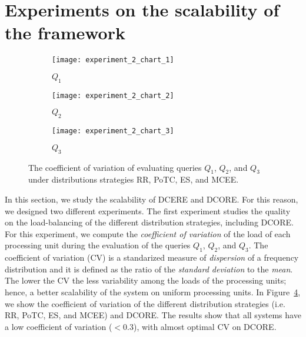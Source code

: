\section{Experiments on the scalability of the framework}\label{sec:scalability}

\begin{figure}[b]
     \begin{adjustbox}{max width=1.5\linewidth,center}
     \centering
     \begin{subfigure}[b]{0.45\textwidth}
         \centering
         \texttt{[image: experiment\_2\_chart\_1]}
         \caption{$Q_{1}$}
         \label{fig:experiment:2:subfigure:1}
     \end{subfigure}
     \begin{subfigure}[b]{0.45\textwidth}
         \centering
         \texttt{[image: experiment\_2\_chart\_2]}
         \caption{$Q_{2}$}
         \label{fig:experiment:2:subfigure:2}
     \end{subfigure}
     \begin{subfigure}[b]{0.45\textwidth}
         \centering
         \texttt{[image: experiment\_2\_chart\_3]}
         \caption{$Q_{3}$}
         \label{fig:experiment:2:subfigure:3}
     \end{subfigure}
     \end{adjustbox}
     \caption{The coefficient of variation of evaluating queries $Q_{1}$, $Q_{2}$, and $Q_{3}$ under distributions strategies RR, PoTC, ES, and MCEE.}
     \label{fig:experiment:2}
\end{figure}

In this section, we study the scalability of DCERE and DCORE. For this reason, we designed two different experiments. The first experiment studies the quality on the load-balancing of the different distribution strategies, including DCORE. For this experiment, we compute the \emph{coefficient of variation} of the load of each processing unit during the evaluation of the queries $Q_{1}$, $Q_{2}$, and $Q_{3}$. The coefficient of variation (CV) is a standarized measure of \emph{dispersion} of a frequency distribution and it is defined as the ratio of the \emph{standard deviation} to the \emph{mean}. The lower the CV the less variability among the loads of the processing units; hence, a better scalability of the system on uniform processing units. In Figure~\ref{fig:experiment:2}, we show the coefficient of variation of the different distribution strategies (i.e. RR, PoTC, ES, and MCEE) and DCORE. The results show that all systems have a low coefficient of variation ($< 0.3$), with almost optimal CV on DCORE.

